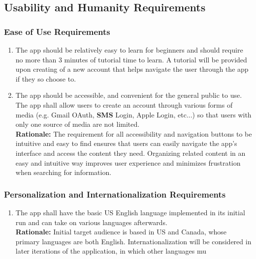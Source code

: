 \documentclass[]{article}
\begin{document}

\subsection{Usability and Humanity Requirements}
\label{sub:usability_and_humanity_requirements}

\subsubsection{Ease of Use Requirements}
\label{ssub:ease_of_use_requirements}
\begin{enumerate}[{UH-EOU}1. ]
	\item The app should be relatively easy to learn for beginners and should require no more than 3 minutes of tutorial time to learn. A tutorial will be provided upon creating of a new account that helps navigate the user through the app if they so choose to.
	\item The app should be accessible, and convenient for the general public to use. The app shall allow users to create an account through various forms of media (e.g. Gmail OAuth, \textbf{SMS} Login, Apple Login, etc...) so that users with only one source of media are not limited.\\
	{\bf Rationale:} The requirement for all accessibility and navigation buttons to be intuitive and easy to find ensures that users can easily navigate the app's interface and access the content they need. Organizing related content in an easy and intuitive way improves user experience and minimizes frustration when searching for information.
\end{enumerate}

\subsubsection{Personalization and Internationalization Requirements}
\label{ssub:personalization_and_internationalization_requirements}
\begin{enumerate}[{UH-PI}1. ]
	\item The app shall have the basic US English language implemented in its initial run and can take on various languages afterwards.\\
	{\bf Rationale:} Initial target audience is based in US and Canada, whose primary languages are both English. Internationalization will be considered in later iterations of the application, in which other languages mu
\end{enumerate}
\end{document}

